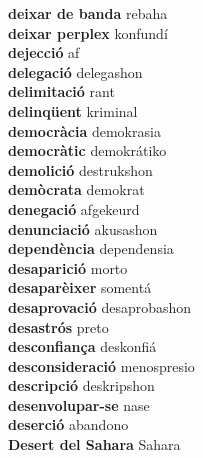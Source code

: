 \textbf{ deixar de banda  } rebaha \\
\textbf{ deixar perplex  } konfundí \\
\textbf{ dejecció  } af \\
\textbf{ delegació  } delegashon \\
\textbf{ delimitació  } rant \\
\textbf{ delinqüent  } kriminal \\
\textbf{ democràcia  } demokrasia \\
\textbf{ democràtic  } demokrátiko \\
\textbf{ demolició  } destrukshon \\
\textbf{ demòcrata  } demokrat \\
\textbf{ denegació  } afgekeurd \\
\textbf{ denunciació  } akusashon \\
\textbf{ dependència  } dependensia \\
\textbf{ desaparició  } morto \\
\textbf{ desaparèixer  } somentá \\
\textbf{ desaprovació  } desaprobashon \\
\textbf{ desastrós  } preto \\
\textbf{ desconfiança  } deskonfiá \\
\textbf{ desconsideració  } menospresio \\
\textbf{ descripció  } deskripshon \\
\textbf{ desenvolupar-se  } nase \\
\textbf{ deserció  } abandono \\
\textbf{ Desert del Sahara  } Sahara \\
